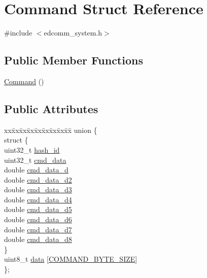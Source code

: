 \hypertarget{structCommand}{\section{Command Struct Reference}
\label{structCommand}
}


{\ttfamily \#include $<$edcomm\-\_\-system.\-h$>$}

\subsection*{Public Member Functions}
\begin{DoxyCompactItemize}
\item 
\hyperlink{structCommand_a18df2d81039392daeb0b78c346a70537}{Command} ()
\end{DoxyCompactItemize}
\subsection*{Public Attributes}
\begin{DoxyCompactItemize}
\item 
\begin{tabbing}
xx\=xx\=xx\=xx\=xx\=xx\=xx\=xx\=xx\=\kill
union \{\\
\>struct \{\\
\>\>uint32\_t \hyperlink{structCommand_abf84080387ae990df8fbae6c9e2ccc2a}{hash\_id}\\
\>\>uint32\_t \hyperlink{structCommand_a395ae7e9bec418c056ada8ba9dd0b7ed}{cmd\_data}\\
\>\>double \hyperlink{structCommand_a1e13b77f668ce8b4f246be119b592b51}{cmd\_data\_d}\\
\>\>double \hyperlink{structCommand_a13b954ce09c483b90493b5c24c238eea}{cmd\_data\_d2}\\
\>\>double \hyperlink{structCommand_ac213dfaa98cd61f31a316d98d60bbf61}{cmd\_data\_d3}\\
\>\>double \hyperlink{structCommand_a99498e04f49c2b09f3e9c706902d094d}{cmd\_data\_d4}\\
\>\>double \hyperlink{structCommand_a1a62682d2485b26e12c3514f1a2b2459}{cmd\_data\_d5}\\
\>\>double \hyperlink{structCommand_aa8fca30c33a9a48bd4f66fc8623ff9a2}{cmd\_data\_d6}\\
\>\>double \hyperlink{structCommand_a0ad6ef120a614b60afaabbd90ade29c2}{cmd\_data\_d7}\\
\>\>double \hyperlink{structCommand_a629ffade344144a38ce2969fd3cdfbd8}{cmd\_data\_d8}\\
\>\} \\
\>uint8\_t \hyperlink{structCommand_a7d7fc3de69ea51affeb1b21b891f6a8e}{data} \mbox{[}\hyperlink{edcomm__system_8h_a0d1ec489be62a2310c9725ac6164abdb}{COMMAND\_BYTE\_SIZE}\mbox{]}\\
\}; \\

\end{tabbing}\end{DoxyCompactItemize}


